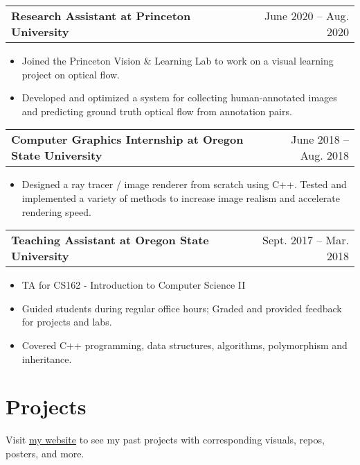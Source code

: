 \documentclass[a4paper,12pt]{article}
\makeatletter
\newenvironment{joblong}[2]
    {
    \begin{tabularx}{\linewidth}{@{}l X r@{}}
    \textbf{#1} & \hfill &  #2 \\[3.75pt]
    \end{tabularx}
    \begin{minipage}[t]{\linewidth}
    \begin{itemize}[nosep,after=\strut, leftmargin=2em, itemsep=3pt,label=--]
    }
    {
    \end{itemize}
    \end{minipage}    
    }
\makeatother
\begin{document}
\begin{adjustwidth}{0.7em}{0pt}
\begin{joblong}{Research Assistant at Princeton University}{June 2020 – Aug. 2020}
\item Joined the Princeton Vision \& Learning Lab to work on a visual learning project on optical flow.
\item Developed and optimized a system for collecting human-annotated images and predicting ground truth optical flow from annotation pairs.
\end{joblong}

\begin{joblong}{Computer Graphics Internship at Oregon State University}{June 2018 – Aug. 2018}
\item Designed a ray tracer / image renderer from scratch using C++. Tested and implemented a variety of methods to increase image realism and accelerate rendering speed.
\end{joblong}

\begin{joblong}{Teaching Assistant at Oregon State University}{Sept. 2017 – Mar. 2018}
\item TA for CS162 - Introduction to Computer Science II
\item Guided students during regular office hours; Graded and provided feedback for projects and labs.
\item Covered C++ programming, data structures, algorithms, polymorphism and inheritance.
\end{joblong}
\end{adjustwidth}

\section{Projects}
\begin{adjustwidth}{0.7em}{0pt}
Visit \href{https://rl27.github.io/}{my website} to see my past projects with corresponding visuals, repos, posters, and more.
\end{adjustwidth}

\end{document}
